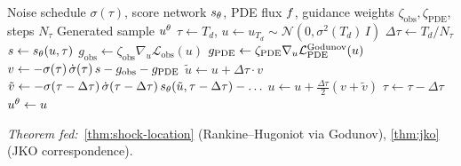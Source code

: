 \begin{algorithm}[t]
    \caption{\emph{EntroDiff} reverse-time sampling. \textbf{Key take-away}: Godunov flux~\eqref{eq:godunov} replaces central differences everywhere a {PDE} residual is evaluated.}
    \label{alg:entrodiff-sample}
    \begin{algorithmic}[1]
        \Require Noise schedule $\sigma(\tau)$, score network $s_{\theta}$, {PDE} flux $f$, guidance weights $\zeta_{\mathrm{obs}},\zeta_{\mathrm{PDE}}$, steps $N_{\tau}$
        \Ensure Generated sample $u^{\theta}$
        \State $\tau \gets T_{d}$, \quad $u \gets u_{T_{d}} \sim \mathcal{N}(0, \sigma^{2}(T_{d})\,I)$
        \State $\Delta\tau \gets T_{d} / N_{\tau}$
            \State $s \gets s_{\theta}(u, \tau)$ 
            \State $g_{\mathrm{obs}} \gets \zeta_{\mathrm{obs}}\nabla_{u}\mathcal{L}_{\mathrm{obs}}(u)$
            \State $g_{\mathrm{PDE}} \gets \zeta_{\mathrm{PDE}}\nabla_{u}\mathcal{L}_{\mathrm{PDE}}^{\mathrm{Godunov}}(u)$ 
            \State $v \gets -\sigma(\tau)\,\dot\sigma(\tau)\,s - g_{\mathrm{obs}} - g_{\mathrm{PDE}}$
            \State $\tilde u \gets u + \Delta\tau \cdot v$ 
            \State $\tilde v \gets -\sigma(\tau-\Delta\tau)\,\dot\sigma(\tau-\Delta\tau)\,s_{\theta}(\tilde u, \tau-\Delta\tau) - \ldots$
            \State $u \gets u + \frac{\Delta\tau}{2}(v + \tilde v)$ 
            \State $\tau \gets \tau - \Delta\tau$
        \EndFor
        \State \Return $u^{\theta} \gets u$
    \end{algorithmic}
\end{algorithm}

\emph{Theorem fed:}~\ref{thm:shock-location} (Rankine--Hugoniot via Godunov), \ref{thm:jko} ({JKO} correspondence).
